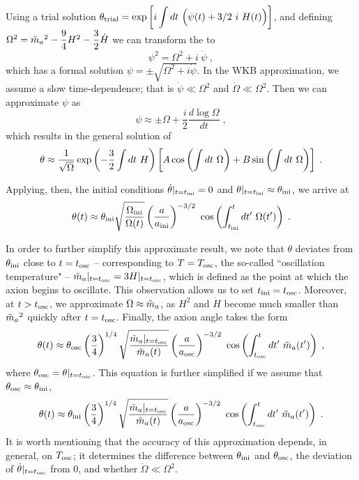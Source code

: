 \documentclass[11pt,a4paper]{article}
\begin{document}
Using a trial solution $\theta_{\rm trial} = \exp\left[  i \displaystyle \int d t \ \Big( \psi(t) +3/2 \ i \ H(t) \Big)  \right]$, and defining $\Omega^2 = \tilde m_{a}{}^2 - \dfrac{9}{4} H^2 -  \dfrac{3}{2} \dot H $ we can transform the  to 
%
\begin{equation}
	\psi^2 = \Omega^2 + i \ \dot \psi \; ,
	\label{eq:eom_of_psi}
\end{equation}
%
which has a formal solution $\psi = \pm \sqrt{\Omega^2 + i \dot \psi}$. In the WKB approximation, we assume a slow time-dependence; that is $\dot \psi \ll \Omega^2$ and $\dot \Omega \ll \Omega^2$. Then we can approximate $\psi$ as
%
\begin{equation}
	\psi \approx \pm \Omega + \dfrac{i}{2} \dfrac{d \log \Omega}{d t} \;,
	\label{eq:u_approx}
\end{equation}
%
which results in the general solution of  
%
\begin{equation}
	\theta \approx \dfrac{1}{\sqrt{\Omega}} \exp\left( -\dfrac{3}{2} \int d t \ H \right) \left[  A \cos\left(  \int d t \ \Omega \right) +  B \sin\left(  \int d t \ \Omega \right)     \right] \;. 
	\label{eq:general_solution_eom_approx}
\end{equation}

Applying, then, the initial conditions $ \dot \theta |_{t=t_{\rm ini}{}} = 0$ and  $\theta|_{t=t_{\rm ini}{}} \approx \theta_{\rm ini}{}$, we arrive at 
%
\begin{equation}
\theta(t) \approx \theta_{\rm ini}{} \sqrt{ \dfrac{ \Omega_{\rm ini} }{\Omega (t)} } \left( \dfrac{a}{a_{\rm ini}{}} \right)^{-3/2} \  \cos\left(  \int_{t_{\rm ini}{}}^t d t^\prime  \ \Omega(t^\prime) \right)   \;.
\label{eq:solution_eom_approx} 
\end{equation}


In order to further simplify this approximate result, we note that $\theta$ deviates from $\theta_{\rm ini}{}$ close to $t=t_{\rm osc}{}$ -- corresponding to $T = T_{\rm osc}{}$, the so-called ``oscillation temperature" -- $\tilde m_{a}{}|_{t = t_{\rm osc}{}} = 3 H|_{t = t_{\rm osc}{}}$, which is defined as the point at which the axion begins to oscillate. 
%
This observation allows us to set $t_{\rm ini}{} = t_{\rm osc}{}$.  Moreover, at $t > t_{\rm osc}{}$, we approximate $\Omega \approx \tilde m_{a}{}$, as $H^2$ and $\dot H$ become much smaller than $\tilde m_{a}{}^2$ quickly after $t=t_{\rm osc}{}$. Finally, the axion angle takes the form
%
\begin{equation}
	\theta(t) \approx \theta_{\rm osc}{} \left( \dfrac{3}{4} \right)^{1/4} \sqrt{ \dfrac{ \tilde m_{a}{}|_{t=t_{\rm osc}{}} }{\tilde m_{a}{}  (t)} } \left( \dfrac{a}{a_{\rm osc}{}} \right)^{-3/2} \  \cos\left(  \int_{t_{\rm osc}{}}^t d t^\prime  \ \tilde m_{a}{}(t^\prime) \right)   \;,
	\label{eq:solution_eom_approx_theta_osc} 
\end{equation}
%
where $\theta_{\rm osc}{} = \theta|_{t=t_{\rm osc}{}}$. This equation is further simplified if we assume that $\theta_{\rm osc}{} \approx \theta_{\rm ini}{}$, \ie
%
\begin{equation}
	\theta(t) \approx \thetai \lrb{\dfrac{3}{4}}^{1/4} \sqrt{ \dfrac{ \maT|_{t=\tosc} }{\maT  (t)} } \lrb{\dfrac{a}{\aosc}}^{-3/2} \  \cos\lrb{ \int_{\tosc}^t d t^\prime  \ \maT(t^\prime)}   \;.
	\label{eq:solution_eom_approx_final} 
\end{equation}
%
It is worth mentioning that the accuracy of this approximation depends, in general, on $T_{\rm osc}{}$; it determines the difference between $\theta_{\rm ini}{}$ and $\theta_{\rm osc}{}$, the deviation of $\dot \theta|_{t=t_{\rm osc}{}}$ from $0$, and whether $\dot \Omega \ll \Omega^2$. 
\end{document}
